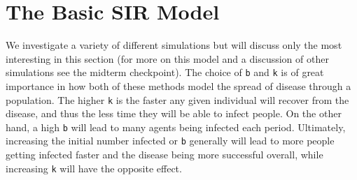 \documentclass[twoside]{extarticle}                                    %
\numberwithin{equation}{section}                                       %
\begin{document}
\section{The Basic SIR Model}
We investigate a variety of different simulations but will discuss only the most interesting in this section (for more on this model and a discussion of other simulations see the midterm checkpoint). The choice of \texttt{b} and \texttt{k} is of great importance in how both of these methods model the spread of disease through a population. The higher \texttt{k} is the faster any given individual will recover from the disease, and thus the less time they will be able to infect people. On the other hand, a high \texttt{b} will lead to many agents being infected each period. Ultimately, increasing the initial number infected or \texttt{b} generally will lead to more people getting infected faster and the disease being more successful overall, while increasing \texttt{k} will have the opposite effect.
\end{document}

